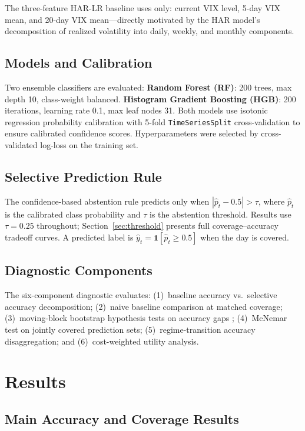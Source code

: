 \documentclass[runningheads]{llncs}
\begin{document}
The three-feature HAR-LR baseline uses only: current VIX level, 5-day VIX
mean, and 20-day VIX mean---directly motivated by the HAR model's
decomposition of realized volatility into daily, weekly, and monthly components.

\subsection{Models and Calibration}

Two ensemble classifiers are evaluated:
\textbf{Random Forest (RF)}: 200 trees, max depth 10, class-weight balanced.
\textbf{Histogram Gradient Boosting (HGB)}: 200 iterations, learning rate 0.1,
max leaf nodes 31.
Both models use isotonic regression probability calibration with 5-fold
\texttt{TimeSeriesSplit} cross-validation to ensure calibrated confidence
scores. Hyperparameters were selected by cross-validated log-loss on the
training set.

\subsection{Selective Prediction Rule}

The confidence-based abstention rule predicts only when
$|\hat{p}_t - 0.5| > \tau$, where $\hat{p}_t$ is the calibrated class
probability and $\tau$ is the abstention threshold. Results use $\tau = 0.25$
throughout; Section~\ref{sec:threshold} presents full coverage--accuracy
tradeoff curves. A predicted label is $\hat{y}_t = \mathbf{1}[\hat{p}_t \geq 0.5]$
when the day is covered.

\subsection{Diagnostic Components}

The six-component diagnostic evaluates: (1)~baseline accuracy vs.\ selective
accuracy decomposition; (2)~naive baseline comparison at matched coverage;
(3)~moving-block bootstrap hypothesis tests on accuracy gaps
\cite{kunsch1989}; (4)~McNemar test on jointly covered prediction sets;
(5)~regime-transition accuracy disaggregation; and (6)~cost-weighted utility
analysis.


\section{Results}

\subsection{Main Accuracy and Coverage Results}
\end{document}
